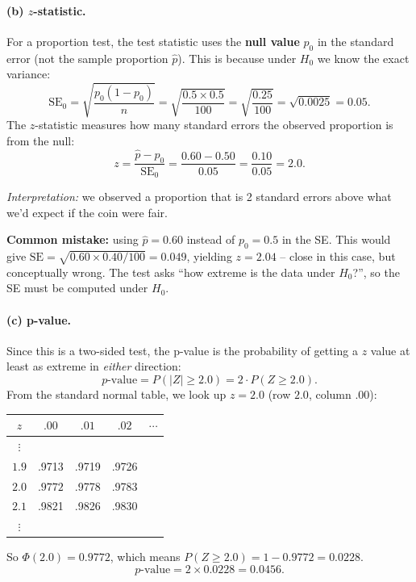 \documentclass[11pt]{article}
\newcommand{\phat}{\hat{p}}
\begin{document}
\paragraph{(b) $z$-statistic.}

For a proportion test, the test statistic uses the \textbf{null value} $p_0$ in the standard error (not the sample proportion $\phat$). This is because under $H_0$ we know the exact variance:
\[
  \text{SE}_0 = \sqrt{\frac{p_0(1-p_0)}{n}} = \sqrt{\frac{0.5 \times 0.5}{100}} = \sqrt{\frac{0.25}{100}} = \sqrt{0.0025} = 0.05.
\]
The $z$-statistic measures how many standard errors the observed proportion is from the null:
\[
  z = \frac{\phat - p_0}{\text{SE}_0} = \frac{0.60 - 0.50}{0.05} = \frac{0.10}{0.05} = \boxed{2.0}.
\]

\textit{Interpretation:} we observed a proportion that is 2 standard errors above what we'd expect if the coin were fair.

\textbf{Common mistake:} using $\phat = 0.60$ instead of $p_0 = 0.5$ in the SE. This would give $\text{SE} = \sqrt{0.60 \times 0.40 / 100} = 0.049$, yielding $z = 2.04$ -- close in this case, but conceptually wrong. The test asks ``how extreme is the data under $H_0$?'', so the SE must be computed under $H_0$.

\paragraph{(c) p-value.}

Since this is a two-sided test, the p-value is the probability of getting a $z$ value at least as extreme in \textit{either} direction:
\[
  p\text{-value} = P(|Z| \geq 2.0) = 2 \cdot P(Z \geq 2.0).
\]
From the standard normal table, we look up $z = 2.0$ (row $2.0$, column $.00$):

\begin{center}
\small
\begin{tabular}{c|cccc}
$z$ & $.00$ & $.01$ & $.02$ & $\cdots$ \\
\hline
$\vdots$ & & & & \\
$1.9$ & .9713 & .9719 & .9726 & \\
$\mathbf{2.0}$ & $\mathbf{.9772}$ & .9778 & .9783 & \\
$2.1$ & .9821 & .9826 & .9830 & \\
$\vdots$ & & & & \\
\end{tabular}
\end{center}

So $\Phi(2.0) = 0.9772$, which means $P(Z \geq 2.0) = 1 - 0.9772 = 0.0228$.
\[
  p\text{-value} = 2 \times 0.0228 = \boxed{0.0456}.
\]
\end{document}
